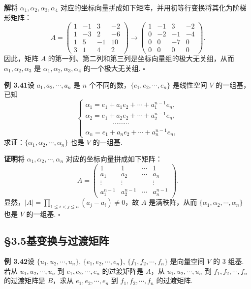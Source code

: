 \documentclass[UTF8, 12pt, fontset=fandol, oneside]{ctexart}
\begin{document}
\noindent\textbf{解}\quad 将 $\alpha_1,\alpha_2,\alpha_3,\alpha_4$ 对应的坐标向量拼成如下矩阵，并用初等行变换将其化为阶梯形矩阵：
\[
A=
\begin{pmatrix}
1 & -1 & 3 & -2\\
1 & -3 & 2 & -6\\
1 & 5 & -1 & 10\\
3 & 1 & 4 & 2
\end{pmatrix}
\to
\begin{pmatrix}
1 & -1 & 3 & -2\\
0 & -2 & -1 & -4\\
0 & 0 & -7 & 0\\
0 & 0 & 0 & 0
\end{pmatrix}.
\]
因此，矩阵 $A$ 的第一列、第二列和第三列是坐标向量组的极大无关组，从而 $\alpha_1,\alpha_2,\alpha_3$ 是 $\alpha_1,\alpha_2,\alpha_3,\alpha_4$ 的一个极大无关组. $\square$

\noindent\textbf{例 3.41}\quad 设 $a_1,a_2,\cdots,a_n$ 是 $n$ 个不同的数，$\{e_1,e_2,\cdots,e_n\}$ 是线性空间 $V$ 的一组基，已知
\[
\left\{
\begin{array}{l}
\alpha_1=e_1+a_1e_2+\cdots+a_1^{n-1}e_n,\\
\alpha_2=e_1+a_2e_2+\cdots+a_2^{n-1}e_n,\\
\hspace{4em}\cdots\cdots\cdots\\
\alpha_n=e_1+a_ne_2+\cdots+a_n^{n-1}e_n,
\end{array}
\right.
\]
求证：$\{\alpha_1,\alpha_2,\cdots,\alpha_n\}$ 也是 $V$ 的一组基.

\noindent\textbf{证明}\quad 将 $\alpha_1,\alpha_2,\cdots,\alpha_n$ 对应的坐标向量拼成如下矩阵：
\[
A=
\begin{pmatrix}
1 & 1 & \cdots & 1\\
a_1 & a_2 & \cdots & a_n\\
\vdots & \vdots &        & \vdots\\
a_1^{n-1} & a_2^{n-1} & \cdots & a_n^{n-1}
\end{pmatrix}.
\]
显然，$|A|=\prod_{1\le i<j\le n}(a_j-a_i)\ne 0$，故 $A$ 是满秩阵，从而 $\{\alpha_1,\alpha_2,\cdots,\alpha_n\}$ 也是 $V$ 的一组基. $\square$

\subsection*{§3.5\quad 基变换与过渡矩阵}

\noindent\textbf{例 3.42}\quad 设 $\{u_1,u_2,\cdots,u_n\}$, $\{e_1,e_2,\cdots,e_n\}$, $\{f_1,f_2,\cdots,f_n\}$ 是向量空间 $V$ 的 3 组基. 若从 $u_1,u_2,\cdots,u_n$ 到 $e_1,e_2,\cdots,e_n$ 的过渡矩阵是 $A$，从 $u_1,u_2,\cdots,u_n$ 到 $f_1,f_2,\cdots,f_n$ 的过渡矩阵是 $B$，求从 $e_1,e_2,\cdots,e_n$ 到 $f_1,f_2,\cdots,f_n$ 的过渡矩阵.
\end{document}
